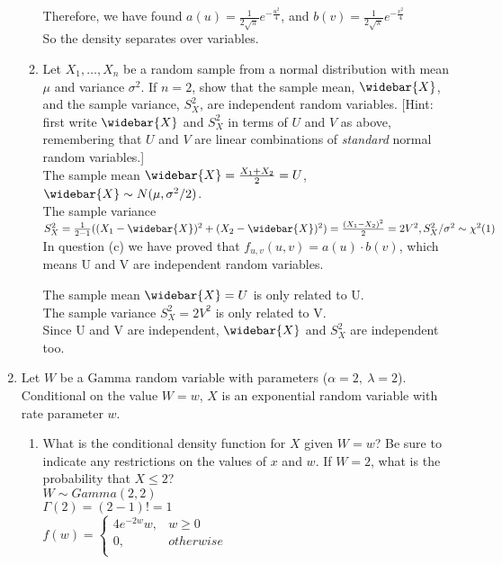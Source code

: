 \documentclass[11pt]{article}
\begin{document}
\begin{enumerate}[label=\textbf{Question \arabic*:},start=1]
\begin{enumerate}
  Therefore, we have found $a(u) = \frac{1}{2\sqrt{\pi}} e^{-\frac{u^2}{4}} $, and $b(v) = \frac{1}{2\sqrt{\pi}} e^{-\frac{v^2}{4}} $\\
  So the density separates over variables.\\
  

  \item Let $X_1,\ldots,X_n$ be a random sample from a normal distribution with mean $\mu$ and variance $\sigma^2$. If $n=2$, show that the sample mean, $\widebar{X}$, and the sample variance, $S_X^2$, are independent random variables. [Hint: first write $\widebar{X}$ and $S_X^2$ in terms of $U$ and $V$ as above, remembering that $U$ and $V$ are linear combinations of {\em standard} normal random variables.]\\
  
  The sample mean $\widebar{X} = \frac{X_1 + X_2}{2} = U $, $\widebar{X} \sim N(\mu, \sigma^2 / 2)$.\\
  The sample variance $S_X^2 = \frac{1}{2-1} ((X_1 - \widebar{X})^2 + (X_2 - \widebar{X})^2) = \frac{(X_1-X_2)^2}{2} = 2 V^2, S_X^2/\sigma^2 \sim \chi^2(1)$\\
  
  In question (c) we have proved that $f_{u,v}(u,v) = a(u) \cdot b(v)$, which means U and V are independent random variables.
  
  The sample mean $\widebar{X} = U$ is only related to U.\\
  The sample variance $S_X^2 = 2 V^2$ is only related to V.\\
  Since U and V are independent, $\widebar{X}$ and $S_X^2$ are independent too.
  
\end{enumerate}




\vspace*{3mm}

\item Let $W$ be a Gamma random variable with parameters ($\alpha = 2,\ \lambda = 2$). Conditional on the value $W = w$, $X$ is an exponential random variable with rate parameter $w$.
\begin{enumerate}
\item What is the conditional density function for $X$ given $W = w$? Be sure to indicate any restrictions on the values of $x$ and $w$. If $W=2$, what is the probability that $X\leq 2$?\\

$W \sim Gamma(2, 2)$ \\
$\Gamma(2) = (2-1)! = 1$ \\
$f(w) = \begin{cases}
		4 e^{-2w} w, & w \geq 0 \\ 
		0, & otherwise\\
		\end{cases}$\\
		

\end{enumerate}
\end{enumerate}
\end{document}
